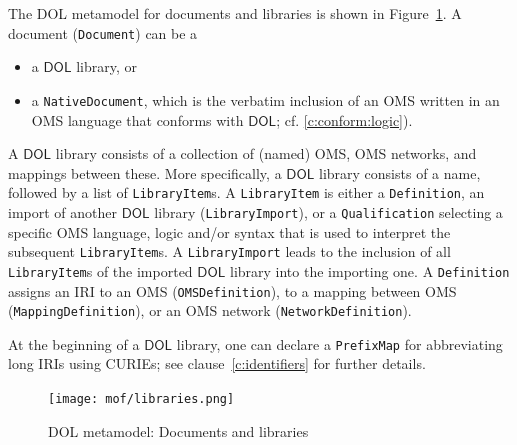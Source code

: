\documentclass[10pt, a4paper]{isov2}
\makeatletter
\newcommand*{\cf}{cf.\@\xspace}
\newcommand*{\termref}[1]{\index{#1}#1\xspace}
\newcommand*{\syntax}[1]{\texttt{#1}}
\newcommand*{\DOL}{\ensuremath{\mathsf{DOL}}\xspace}
\renewcommand{\clauserefname}{clause}
\renewcommand{\cref}[1]{\clauserefname~\ref{#1}}
\makeatother
\begin{document}
The DOL metamodel for documents and libraries is shown in Figure~\ref{fig:libraries}.
A \termref{document} (\syntax{Document}) can be a
\begin{itemize}
\item a \DOL library, or
\item a \syntax{NativeDocument}, which is the verbatim inclusion of an
  OMS written in an OMS language that conforms with \DOL; \cf
  \ref{c:conform:logic}).
\end{itemize}
A \DOL library consists of a collection of (named)  OMS,  OMS networks, and mappings between these.  More specifically, a \DOL
library consists of a name, followed by a list of
\syntax{LibraryItem}s.  A \syntax{LibraryItem} is either a
\syntax{Definition},
an import of another \DOL library (\syntax{LibraryImport}),
or a \syntax{Qualification} selecting a specific
OMS language, logic and/or syntax that is used to interpret the
subsequent \syntax{LibraryItem}s.
 A \syntax{LibraryImport} leads to the inclusion of all \syntax{LibraryItem}s of the imported \DOL library into the importing one.
A \syntax{Def\-inition} assigns an IRI to an OMS  (\syntax{OMSDefinition}),
to a mapping between OMS (\syntax{MappingDefinition}), or
an OMS network  (\syntax{NetworkDefinition}).

At the beginning of a \DOL library, one can declare a \syntax{PrefixMap} for abbreviating long IRIs  using CURIEs; see \cref{c:identifiers} for further details.

\medskip
\begin{figure}
  \centering
    \texttt{[image: mof/libraries.png]}
  \caption{DOL metamodel: Documents and libraries}
  \label{fig:libraries}
\end{figure}


\vspace{-2em}
\end{document}
